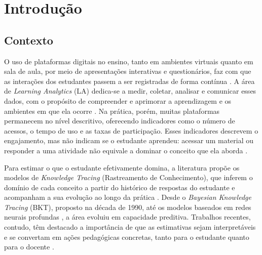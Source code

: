 
\chapter[Introdução]{Introdução}

\section{Contexto}
\label{sec:contexto}

O uso de plataformas digitais no ensino, tanto em ambientes virtuais quanto em sala de aula, por meio de apresentações interativas e questionários, faz com que as interações dos estudantes passem a ser registradas de forma contínua \cite{cao_multi-granularity_2025}. A área de \textit{Learning Analytics} (LA) dedica-se a medir, coletar, analisar e comunicar esses dados, com o propósito de compreender e aprimorar a aprendizagem e os ambientes em que ela ocorre \cite{siemens_learning_2012}. Na prática, porém, muitas plataformas permanecem no nível descritivo, oferecendo indicadores como o número de acessos, o tempo de uso e as taxas de participação. Esses indicadores descrevem o engajamento, mas não indicam se o estudante aprendeu: acessar um material ou responder a uma atividade não equivale a dominar o conceito que ela aborda \cite{gaevic_learning_2015}.

Para estimar o que o estudante efetivamente domina, a literatura propõe os modelos de \textit{Knowledge Tracing} (Rastreamento de Conhecimento), que inferem o domínio de cada conceito a partir do histórico de respostas do estudante e acompanham a sua evolução ao longo da prática \cite{corbett_knowledge_1994}. Desde o \textit{Bayesian Knowledge Tracing} (BKT), proposto na década de 1990, até os modelos baseados em redes neurais profundas \cite{piech_deep_2015}, a área evoluiu em capacidade preditiva. Trabalhos recentes, contudo, têm destacado a importância de que as estimativas sejam interpretáveis e se convertam em ações pedagógicas concretas, tanto para o estudante quanto para o docente \cite{cao_multi-granularity_2025, liao_naviedu_2026}.

